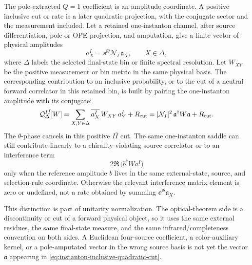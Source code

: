 \begin{controlledapproximation}
\label{ca:instanton-inclusive-cut-quadratic-projection}
The pole-extracted \(Q=1\) coefficient is an amplitude coordinate.  A positive
inclusive cut or rate is a later quadratic projection, with the conjugate
sector and the measurement included.  Let a retained one-instanton channel,
after source differentiation, pole or OPE projection, and amputation, give a
finite vector of physical amplitudes
\[
  a_X^{I}
  =
  \ee^{\ii\theta}
  \mathcal N_I\,\mathfrak a_X ,
  \qquad X\in\Delta ,
\]
where \(\Delta\) labels the selected final-state bin or finite spectral
resolution.  Let \(W_{XY}\) be the positive measurement or bin metric in the
same physical basis.  The corresponding contribution to an inclusive
probability, or to the cut of a neutral forward correlator in this retained
bin, is built by pairing the one-instanton amplitude with its conjugate:
\begin{equation}
  \mathcal Q_{\Delta}^{I\bar I}[W]
  =
  \sum_{X,Y\in\Delta}
  \overline{a_X^{I}}\,
  W_{XY}\,
  a_Y^{I}
  +R_{\rm cut}
  =
  |\mathcal N_I|^2\,
  \mathfrak a^\dagger W\mathfrak a
  +R_{\rm cut}.
  \label{eq:instanton-inclusive-quadratic-cut}
\end{equation}
The \(\theta\)-phase cancels in this positive \(I\bar I\) cut.  The same
one-instanton saddle can still contribute linearly to a chirality-violating
source correlator or to an interference term
\[
  2\Re\,
  \bigl(
    b^\dagger W a^I
  \bigr)
\]
only when the reference amplitude \(b\) lives in the same external-state,
source, and selection-rule coordinate.  Otherwise the relevant interference
matrix element is zero or undefined, not a rate obtained by summing
\(\ee^{\ii\theta}\mathfrak a_X\).

This distinction is part of unitarity normalization.  The optical-theorem
side is a discontinuity or cut of a forward physical object, so it uses the
same external residues, the same final-state measure, and the same
infrared/completeness convention on both sides.  A Euclidean four-source
coefficient, a color-auxiliary kernel, or a pole-amputated vector in the
wrong source basis is not yet the vector \(\mathfrak a\) appearing in
\eqref{eq:instanton-inclusive-quadratic-cut}.


\end{controlledapproximation}
